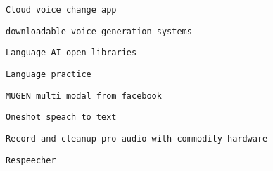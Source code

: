          
         
          \protect\hypertarget{ID_652434642}{}{}

\begin{verbatim}
Cloud voice change app
\end{verbatim}
         

         
         
          \protect\hypertarget{ID_1118099156}{}{}

\begin{verbatim}
downloadable voice generation systems
\end{verbatim}
         

         
         
          \protect\hypertarget{ID_1088332487}{}{}

\begin{verbatim}
Language AI open libraries
\end{verbatim}
         

         
         
          \protect\hypertarget{ID_1745513471}{}{}

\begin{verbatim}
Language practice
\end{verbatim}
         

         
         
          \protect\hypertarget{ID_1741819960}{}{}

\begin{verbatim}
MUGEN multi modal from facebook
\end{verbatim}
         

         
         
          \protect\hypertarget{ID_1476899969}{}{}

\begin{verbatim}
Oneshot speach to text
\end{verbatim}
         

         
         
          \protect\hypertarget{ID_907779645}{}{}

\begin{verbatim}
Record and cleanup pro audio with commodity hardware
\end{verbatim}
         

         
         
          \protect\hypertarget{ID_107097058}{}{}

\begin{verbatim}
Respeecher
\end{verbatim}
         

